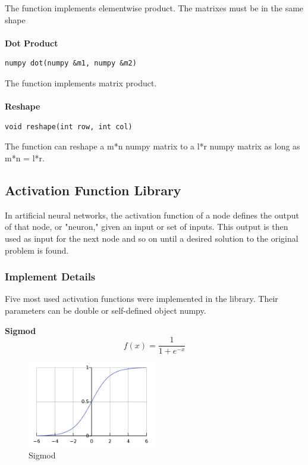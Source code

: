 \documentclass[a4paper]{article}
\begin{document}
The function implements elementwise product. The matrixes must be in the same shape\\\\
\textbf{\Large Dot Product}\\
\begin{lstlisting}[language={[ANSI]C++},keywordstyle=\color{blue!70},commentstyle=\color{red!50!green!50!blue!50},frame=shadowbox, rulesepcolor=\color{red!20!green!20!blue!20}]
numpy dot(numpy &m1, numpy &m2)
\end{lstlisting}

The function implements matrix product. \\\\
\textbf{\Large Reshape}\\
\begin{lstlisting}[language={[ANSI]C++},keywordstyle=\color{blue!70},commentstyle=\color{red!50!green!50!blue!50},frame=shadowbox, rulesepcolor=\color{red!20!green!20!blue!20}]
void reshape(int row, int col)
\end{lstlisting}

The function can reshape a m*n numpy matrix to a l*r numpy matrix as long as m*n = l*r.\\

\subsection{Activation Function Library}
In artificial neural networks, the activation function of a node defines the output of that node, or "neuron," given an input or set of inputs. This output is then used as input for the next node and so on until a desired solution to the original problem is found\cite{nano1}.
\subsubsection{Implement Details}
Five most used activation functions were implemented in the library. Their parameters can be double or self-defined object numpy.

\textbf{Sigmod}
$$f(x)=\frac{1}{1+e^{-x}}$$
\begin{figure}[H]
\centering
\includegraphics[width=0.5\textwidth]{sigmod.png}
\caption{\label{fig:frog}Sigmod}
\end{figure}
\end{document}
